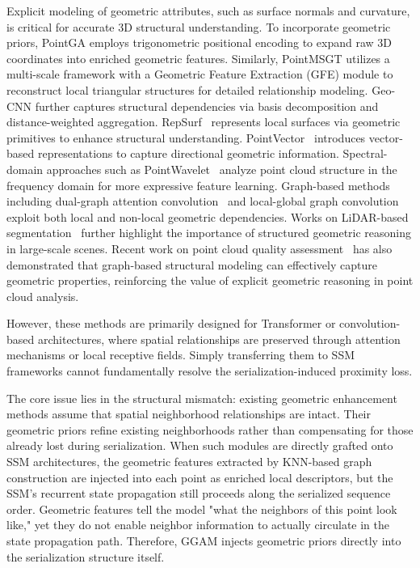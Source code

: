 \documentclass[a4paper,fleqn]{cas-sc}
\begin{document}
Explicit modeling of geometric attributes, such as surface normals and
curvature, is critical for accurate 3D structural understanding. To
incorporate geometric priors, PointGA \cite{pointga} employs
trigonometric positional encoding to expand raw 3D coordinates
into enriched geometric features. Similarly, PointMSGT \cite{pointmsgt}
utilizes a multi-scale framework with a Geometric Feature Extraction
(GFE) module to reconstruct local triangular structures for detailed
relationship modeling. Geo-CNN \cite{geo-cnn} further captures
structural dependencies via basis decomposition and distance-weighted
aggregation. RepSurf~\cite{repsurf} represents local surfaces via geometric primitives to enhance structural understanding. PointVector~\cite{pointvector} introduces vector-based representations to capture directional geometric information. Spectral-domain approaches such as PointWavelet~\cite{pointwavelet} analyze point cloud structure in the frequency domain for more expressive feature learning. Graph-based methods including dual-graph attention convolution~\cite{dgacn} and local-global graph convolution~\cite{lggcm} exploit both local and non-local geometric dependencies. Works on LiDAR-based segmentation~\cite{lidar_segmentation} further highlight the importance of structured geometric reasoning in large-scale scenes. Recent work on point cloud quality assessment~\cite{noReference} has also demonstrated that graph-based structural modeling can effectively capture geometric properties, reinforcing the value of explicit geometric reasoning in point cloud analysis.

However, these methods are primarily designed for Transformer or convolution-based architectures, where spatial relationships are preserved through attention mechanisms or local receptive fields. Simply transferring them to SSM frameworks cannot fundamentally resolve the serialization-induced proximity loss.

The core issue lies in the structural mismatch: existing geometric enhancement methods assume that spatial neighborhood relationships are intact. Their geometric priors refine existing neighborhoods rather than compensating for those already lost during serialization. When such modules are directly grafted onto SSM architectures, the geometric features extracted by KNN-based graph construction are injected into each point as enriched local descriptors, but the SSM's recurrent state propagation still proceeds along the serialized sequence order. Geometric features tell the model "what the neighbors of this point look like," yet they do not enable neighbor information to actually circulate in the state propagation path. Therefore, GGAM injects geometric priors directly into the serialization structure itself.
\end{document}
